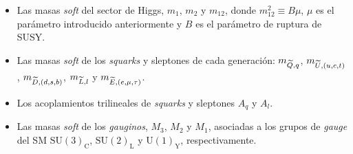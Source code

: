 \begin{itemize}\itemsep0.2cm\parskip0.2cm
\item Las masas \emph{soft} del sector de Higgs, $m_1$, $m_2$ y $m_{12}$, donde $m_{12}^2 \equiv B\mu$,
  $\mu$ es el parámetro introducido anteriormente y $B$ es el parámetro de ruptura
  de SUSY.

\item Las masas \emph{soft} de los \emph{squarks} y sleptones de cada generación:
  $m_{\widetilde{Q},q}$, $m_{\widetilde{U},(u,c,t)}$, $m_{\widetilde{D},(d,s,b)}$, $m_{\widetilde{L},l}$ y
  $m_{\widetilde{E},(e,\mu,\tau)}$.

\item Los acoplamientos trilineales de \emph{squarks} y sleptones $A_q$ y $A_l$.

\item Las masas \emph{soft} de los \emph{gauginos}, $M_3$, $M_2$ y $M_1$, asociadas a los
  grupos de \emph{gauge} del SM $\text{SU}(3)_\text{C}$, $\text{SU}(2)_\text{L}$ y $\text{U}(1)_\text{Y}$, respectivamente.

\end{itemize}





